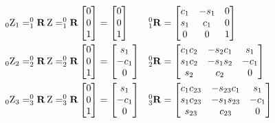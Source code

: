 \begin{align}
    _0\textup{Z}_1 &= ^0_1\mathbf{R} \, \textup{Z} = ^0_1\mathbf{R} \begin{bmatrix}
        0 \\ 0 \\ 1
        \end{bmatrix} = \begin{bmatrix}
        0 \\ 0 \\ 1
        \end{bmatrix}
    &&
    ^0_1\mathbf{R} = \begin{bmatrix}
        c_1 & -s_1 & 0 \\
        s_1 & c_1 & 0 \\
        0 & 0 & 1
        \end{bmatrix}
    \nonumber \\
    _0\textup{Z}_2 &= ^0_2\mathbf{R} \, \textup{Z} = ^0_2\mathbf{R} \begin{bmatrix}
        0 \\ 0 \\ 1
        \end{bmatrix} = \begin{bmatrix}
        s_1 \\ -c_1 \\ 0
        \end{bmatrix}
    &&
    ^0_2\mathbf{R} = \begin{bmatrix}
        c_1 c_2 & -s_2 c_1 & s_1 \\
        s_1 c_2 & -s_1 s_2 & -c_1 \\
        s_2 & c_2 & 0
        \end{bmatrix}
    \nonumber \\
    _0\textup{Z}_3 &= ^0_3\mathbf{R} \, \textup{Z} = ^0_3\mathbf{R} \begin{bmatrix}
        0 \\ 0 \\ 1
        \end{bmatrix} = \begin{bmatrix}
        s_1 \\ -c_1 \\ 0
        \end{bmatrix}
    &&
    ^0_3\mathbf{R} = \begin{bmatrix}
        c_1 c_{23} & -s_{23} c_1 & s_1 \\
        s_1 c_{23} & -s_1 s_{23} & -c_1 \\
        s_{23} & c_{23} & 0
        \end{bmatrix}
    \nonumber
\end{align}

